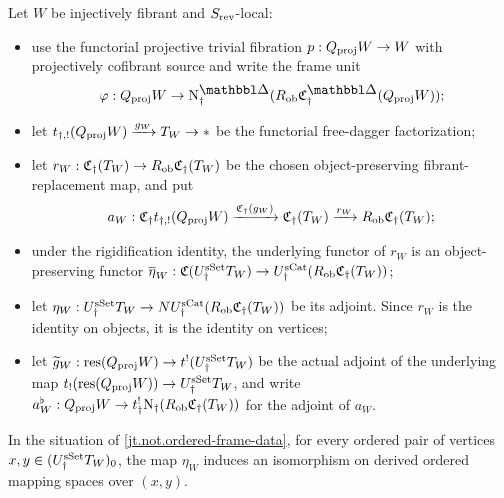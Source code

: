 \documentclass[a4paper,dvipdfmx,11pt]{amsart}
\begin{document}
\begin{notation}\label{jt.not.ordered-frame-data}
  Let $W$ be injectively fibrant and $S_{\mathrm{rev}}$-local:
  \begin{itemize}
    \item use the functorial projective trivial fibration $p:Q_{\mathrm{proj}}W\to W$ with projectively cofibrant source and write the frame unit
    \begin{align}
      \varphi:
      Q_{\proj}W
      \to
      \N^{\prism}_{\dag}
      (R_{\rmob}\frakC^{\prism}_{\dag}(Q_{\proj}W));
    \end{align}
    \item let $t_{\dag,!}(Q_{\mathrm{proj}}W) \xrightarrow{g_W} T_W \to *$ be the functorial free-dagger factorization;
    \item let $r_W: \mathfrak{C}_{\dag}(T_W) \to R_{\mathrm{ob}}\mathfrak{C}_{\dag}(T_W)$ be the chosen object-preserving fibrant-replacement map, and put 
    \begin{align}
      a_W:
      \mathfrak{C}_{\dag}t_{\dag,!}(Q_{\mathrm{proj}}W)
      \xrightarrow{\mathfrak{C}_{\dag}(g_W)}
      \mathfrak{C}_{\dag}(T_W)
      \xrightarrow{r_W}
      R_{\mathrm{ob}}\mathfrak{C}_{\dag}(T_W);
    \end{align}
    \item under the rigidification identity, the underlying functor of $r_W$ is an object-preserving functor $\overline{\eta}_W: \mathfrak{C}(U_{\dag}^{\mathrm{sSet}} T_W) \to U_{\dag}^{\mathrm{sCat}}(R_{\mathrm{ob}}\mathfrak{C}_{\dag}(T_W))$;
    \item let $\eta_W: U_{\dag}^{\mathrm{sSet}} T_W \to NU_{\dag}^{\mathrm{sCat}}(R_{\mathrm{ob}}\mathfrak{C}_{\dag}(T_W))$ be its adjoint.
    Since $r_W$ is the identity on objects, it is the identity on vertices;
    \item let $\widetilde g_W: \mathrm{res}(Q_{\mathrm{proj}}W) \to t^!(U_{\dag}^{\mathrm{sSet}} T_W)$ be the actual adjoint of the underlying map $t_!(\mathrm{res}(Q_{\mathrm{proj}}W))\to U_{\dag}^{\mathrm{sSet}} T_W$, and write $a_W^{\flat}: Q_{\mathrm{proj}}W \to t_{\dag}^{!}\mathrm{N}_{\dag}(R_{\mathrm{ob}}\mathfrak{C}_{\dag}(T_W))$ for the adjoint of $a_W$.
  \end{itemize}
\end{notation}

\begin{lemma}\label{jt.lem.ordered-rigidification-unit}
  In the situation of \cref{jt.not.ordered-frame-data}, for every ordered pair of vertices $x,y\in(U_{\dag}^{\mathrm{sSet}} T_W)_0$, the map $\eta_W$ induces an isomorphism on derived ordered mapping spaces over $(x,y)$.
\end{lemma}
\end{document}
